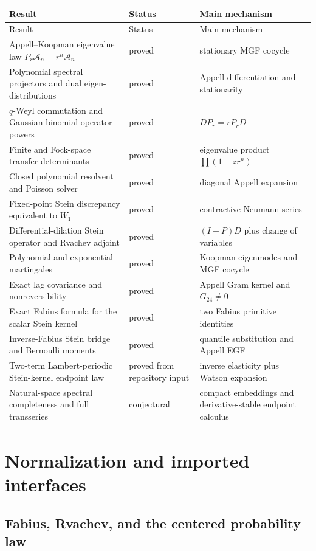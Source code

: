 \documentclass[11pt,a4paper]{article}
\theoremstyle{definition}
\theoremstyle{remark}
\newcommand{\Acal}{\mathcal A}
\begin{document}
\begin{longtable}{@{}p{}p{}p{}@{}}
\toprule
Result & Status & Main mechanism \\
\midrule
\endfirsthead
\toprule
Result & Status & Main mechanism \\
\midrule
\endhead
Appell--Koopman eigenvalue law $P_r\Acal_n=r^n\Acal_n$ & proved & stationary MGF cocycle \\
Polynomial spectral projectors and dual eigen-distributions & proved & Appell differentiation and stationarity \\
$q$-Weyl commutation and Gaussian-binomial operator powers & proved & $DP_r=rP_rD$ \\
Finite and Fock-space transfer determinants & proved & eigenvalue product $\prod(1-zr^n)$ \\
Closed polynomial resolvent and Poisson solver & proved & diagonal Appell expansion \\
Fixed-point Stein discrepancy equivalent to $W_1$ & proved & contractive Neumann series \\
Differential-dilation Stein operator and Rvachev adjoint & proved & $(I-P)D$ plus change of variables \\
Polynomial and exponential martingales & proved & Koopman eigenmodes and MGF cocycle \\
Exact lag covariance and nonreversibility & proved & Appell Gram kernel and $G_{24}\ne0$ \\
Exact Fabius formula for the scalar Stein kernel & proved & two Fabius primitive identities \\
Inverse-Fabius Stein bridge and Bernoulli moments & proved & quantile substitution and Appell EGF \\
Two-term Lambert-periodic Stein-kernel endpoint law & proved from repository input & inverse elasticity plus Watson expansion \\
Natural-space spectral completeness and full transseries & conjectural & compact embeddings and derivative-stable endpoint calculus \\
\bottomrule
\end{longtable}

\section{Normalization and imported interfaces}
\label{sec:normalization}

\subsection{Fabius, Rvachev, and the centered probability law}
\end{document}
